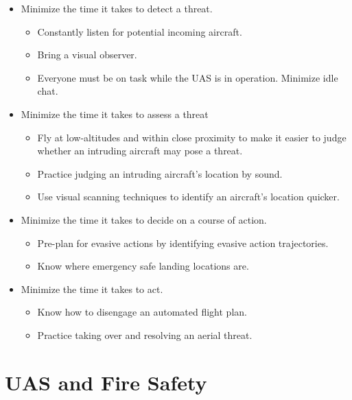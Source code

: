 \documentclass[
]{book}
\providecommand{\tightlist}{%
  \setlength{\itemsep}{0pt}\setlength{\parskip}{0pt}}
\begin{document}
\begin{itemize}
\item
  Minimize the time it takes to detect a threat.

  \begin{itemize}
  \tightlist
  \item
    Constantly listen for potential incoming aircraft.
  \item
    Bring a visual observer.
  \item
    Everyone must be on task while the UAS is in operation. Minimize idle chat.
  \end{itemize}
\item
  Minimize the time it takes to assess a threat

  \begin{itemize}
  \tightlist
  \item
    Fly at low-altitudes and within close proximity to make it easier to judge whether an intruding aircraft may pose a threat.
  \item
    Practice judging an intruding aircraft's location by sound.
  \item
    Use visual scanning techniques to identify an aircraft's location quicker.
  \end{itemize}
\item
  Minimize the time it takes to decide on a course of action.

  \begin{itemize}
  \tightlist
  \item
    Pre-plan for evasive actions by identifying evasive action trajectories.
  \item
    Know where emergency safe landing locations are.
  \end{itemize}
\item
  Minimize the time it takes to act.

  \begin{itemize}
  \tightlist
  \item
    Know how to disengage an automated flight plan.
  \item
    Practice taking over and resolving an aerial threat.
  \end{itemize}
\end{itemize}

\hypertarget{s-fire-safety}{%
\section{UAS and Fire Safety}\label{s-fire-safety}}
\end{document}
